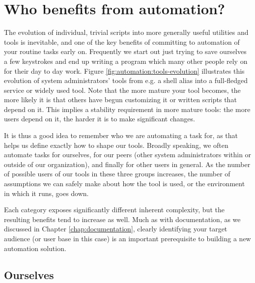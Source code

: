
\section{Who benefits from automation?}
\label{automation:who-benefits}

The evolution of individual, trivial scripts into more
generally useful utilities and tools is inevitable,
and one of the key benefits of committing to
automation of your routine tasks early on.  Frequently
we start out just trying to save ourselves a few
keystrokes and end up writing a program which many
other people rely on for their day to day work.
Figure \ref{fig:automation:tools-evolution}
illustrates this evolution of system administrators'
tools from e.g. a shell alias into a full-fledged
service or widely used tool.  Note that the more
mature your tool becomes, the more likely it is that
others have begun customizing it or written scripts
that depend on it.  This implies a stability
requirement in more mature tools: the more users
depend on it, the harder it is to make significant
changes.

It is thus a good idea to remember who we are
automating a task for, as that helps us define exactly
how to shape our tools.  Broadly speaking, we often
automate tasks for ourselves, for our peers (other
system administrators within or outside of our
organization), and finally for other users in general.
As the number of possible users of our tools in these
three groups increases, the number of assumptions we
can safely make about how the tool is used, or the
environment in which it runs, goes down.

Each category exposes significantly different inherent
complexity, but the resulting benefits tend to
increase as well.  Much as with documentation, as we
discussed in Chapter \ref{chap:documentation}, clearly
identifying your target audience (or user base in this
case) is an important prerequisite to building a new
automation solution.

\subsection{Ourselves}
\label{automation:who-benefits:ourselves}

